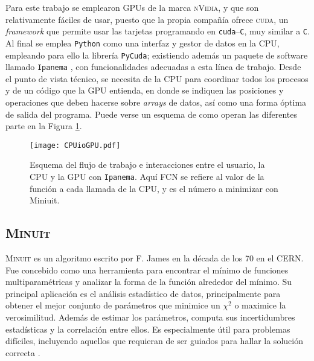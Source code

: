 Para este trabajo se emplearon GPUs de la marca \textsc{nVidia}, y que son relativamente fáciles de usar, puesto que la propia compañía ofrece \textsc{cuda}, un \textit{framework} que permite usar las tarjetas programando en \texttt{cuda}--\texttt{C}, muy similar a \texttt{C}.
%
Al final se emplea \texttt{Python} como una interfaz y gestor de datos en la CPU, empleando para ello la librería \texttt{PyCuda}; existiendo además un paquete de software llamado \texttt{Ipanema} \cite{santos2017ipanema}, con funcionalidades adecuadas a esta línea de trabajo. Desde el punto de vista técnico, se necesita de la CPU para coordinar todos los procesos y de un código que la GPU entienda, en donde se indiquen las posiciones y operaciones que deben hacerse sobre \emph{arrays} de datos, así como una forma óptima de salida del programa. Puede verse un esquema de como operan las diferentes parte en la Figura \ref{fig:CPUioGPU}.





\begin{figure}[H]
  \centering
  \texttt{[image: CPUioGPU.pdf]}
  \caption{Esquema del flujo de trabajo e interacciones entre el usuario, la CPU y la GPU con \texttt{Ipanema}. Aquí FCN se refiere al valor de la función a cada llamada de la CPU, y es el número a minimizar con Miniuit.} \label{fig:CPUioGPU}
\end{figure}


\subsection{\textsc{Minuit}}

\textsc{Minuit} es un algoritmo escrito por F. James en la década de los 70 en el CERN. Fue concebido como una herramienta para encontrar el mínimo de funciones multiparamétricas y analizar la forma de la función alrededor del mínimo. Su principal aplicación es el análisis estadístico de datos, principalmente para obtener el mejor conjunto de parámetros que minimice un $\chi^2$ o maximice la verosimilitud. Además de estimar los parámetros, computa sus incertidumbres estadísticas y la correlación entre ellos. Es especialmente útil para problemas difíciles, incluyendo aquellos que requieran de ser guiados para hallar la solución correcta 
\cite{James:1975dr}.

